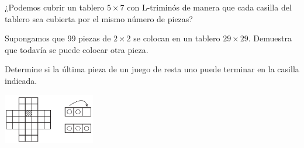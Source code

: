 \documentclass[11pt]{scrartcl}
\begin{document}
\begin{problem}[Rusia 1996] ¿Podemos cubrir un tablero $5 \times 7$ con L-triminós de manera que cada casilla del tablero sea cubierta por el mismo número de piezas?
\end{problem}

\begin{problem}
Supongamos que 99 piezas de $2 \times 2$ se colocan en un tablero $29 \times 29$. Demuestra que todavía se puede colocar otra pieza.
\end{problem}

\begin{problem}
Determine si la última pieza de un juego de resta uno puede terminar en la casilla indicada.
\begin{center}
    \includegraphics[width=4cm]{images/clase_09_Resta_Um.png}
\end{center}
\end{problem}


%
\end{document}
